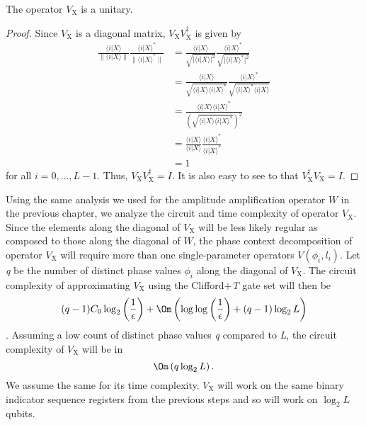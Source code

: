 \begin{lemma}
	The operator $V_{\mathrm{X}}$ is a unitary. 
\end{lemma}
\begin{proof}
Since $V_{\mathrm{X}}$ is a diagonal matrix, $V_{\mathrm{X}}V_{\mathrm{X}}^\dagger $ is given by
\begin{equation*}
	\begin{split}
		\frac{\langle i \vert X \rangle}{\| \langle i \vert X \rangle \|}\frac{\langle i \vert X \rangle^\ast}{\| \langle i \vert X \rangle^\ast \|} &= \frac{\langle i \vert X \rangle}{ \sqrt{ \vert \langle i \vert X \rangle \vert^2} }\frac{\langle i \vert X \rangle^\ast}{ \sqrt{ \vert \langle i \vert X \rangle^\ast \vert^2 }}\\
		&= \frac{\langle i \vert X \rangle}{ \sqrt{ \langle i \vert X \rangle\langle i \vert X \rangle^\ast } }\frac{\langle i \vert X \rangle^\ast}{ \sqrt{ \langle i \vert X \rangle^\ast\langle i \vert X \rangle }}\\
		&= \frac{\langle i \vert X \rangle\langle i \vert X \rangle^\ast}{ \left(\sqrt{ \langle i \vert X \rangle\langle i \vert X \rangle^\ast } \right)^2 }\\
		&= \frac{\langle i \vert X \rangle}{ \langle i \vert X \rangle }\frac{\langle i \vert X \rangle^\ast}{ \langle i \vert X \rangle^\ast }\\
		&= 1
	\end{split}
\end{equation*}
for all $i=0,\ldots,L-1$. Thus, $V_{\mathrm{X}}V_{\mathrm{X}}^{\dagger}=I$. It is also easy to see to that $V_{\mathrm{X}}^{\dagger}V_{\mathrm{X}}=I$.
\end{proof}
Using the same analysis we used for the amplitude amplification operator $W$ in the previous chapter, we analyze the circuit and time complexity of operator $V_{\mathrm{X}}$. Since the elements along the diagonal of $V_{\mathrm{X}}$ will be less likely regular as composed to those along the diagonal of $W$, the phase context decomposition of operator $V_{\mathrm{X}}$ will require more than one single-parameter operators $V\left( \phi_i, l_i \right)$. Let \textit{q} be the number of distinct phase values $\phi_i$ along the diagonal of $V_{\mathrm{X}}$. The circuit complexity of approximating $V_{\mathrm{X}}$ using the Clifford+\textit{T} gate set will then be 
\[
	(q-1)C_0\log_2 \left( \frac{1}{\epsilon} \right) + \Om\left( \log\log \left(\frac{1}{\epsilon}\right) + (q-1)\log_2 L \right)
\]
\cite{Bocharov2015}. Assuming a low count of distinct phase values \textit{q} compared to \textit{L}, the circuit complexity of $V_{\mathrm{X}}$ will be in 
\[
	\Om\left( q\log_2 L \right).
\]
We assume the same for its time complexity. $V_{\mathrm{X}}$ will work on the same binary indicator sequence registers from the previous steps and so will work on $\log_2 L$ qubits.

